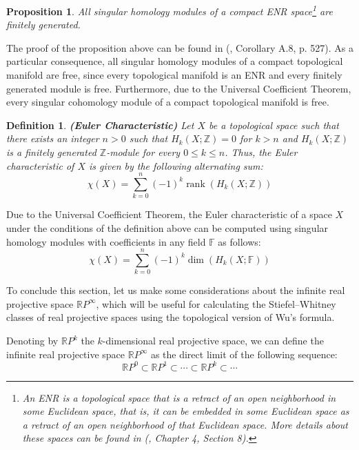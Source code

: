 \documentclass[12pt,oneside]{book}
\newtheorem{defi}   {Definition}[chapter]
\newtheorem{prop}   {Proposition}[chapter]
\newcommand{\ds}{\displaystyle}
\newcommand{\RP}{\mathbb{R}P}
\newcommand{\Z}{\mathbb{Z}}
\newcommand{\F}{\mathbb{F}}
\begin{document}
    \begin{prop}
        All singular homology modules of a compact ENR space\footnote{An ENR is a topological space that is a retract of an open 
        neighborhood in some Euclidean space, that is, it can be embedded in some Euclidean space as a retract of an open neighborhood of that 
        Euclidean space. More details about these spaces can be found in (\cite{dold}, Chapter 4, Section 8).} are finitely 
        generated.
    \end{prop}
    
    The proof of the proposition above can be found in (\cite{hatcher}, Corollary A.8, p. 527). As a particular consequence, all singular 
    homology modules of a compact topological manifold are free, since every topological manifold is an ENR and 
    every finitely generated module is free. Furthermore, due to the Universal Coefficient Theorem, every singular 
    cohomology module of a compact topological manifold is free.
    
    \begin{defi}{\bf (Euler Characteristic)}
        Let $X$ be a topological space such that there exists an integer $n>0$ such that $H_{k}(X;\Z)=0$ for $k>n$ and $H_{k}(X;\Z)$ is a 
        finitely generated $\Z$-module for every $0\leq k\leq n$. Thus, the Euler characteristic of $X$ is given 
        by the following alternating sum:
        $$ \chi(X)=\ds\sum_{k=0}^{n}(-1)^{k}\operatorname{rank}(H_{k}(X;\Z)) $$
    \end{defi}
    
    Due to the Universal Coefficient Theorem, the Euler characteristic of a space $X$ under the 
    conditions of the definition above can be computed using singular homology modules with coefficients in any field $\F$ as follows:
    $$ \chi(X)=\ds\sum_{k=0}^{n}(-1)^{k}\dim(H_{k}(X;\F)) $$
    
    To conclude this section, let us make some considerations about the infinite real projective space 
    $\RP^{\infty}$, which will be useful for calculating the Stiefel–Whitney classes of real projective spaces 
    using the topological version of Wu's formula.
    
    Denoting by $\RP^{k}$ the $k$-dimensional real projective space, we can define the infinite real 
    projective space $\RP^{\infty}$ as the direct limit of the following sequence:
    $$ \RP^{0} \subset \RP^{1} \subset \cdots \subset \RP^{k} \subset \cdots $$
    
\end{document}
